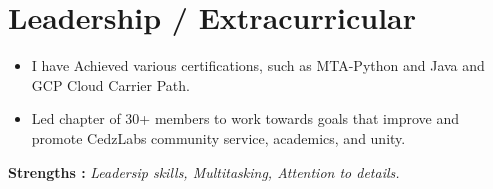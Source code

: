 \documentclass[letterpaper,11pt]{article}
\newcommand{\resumeItem}[1]{
  \item\small{
    {#1 \vspace{-2pt}}
  }
}
\newcommand{\resumeItemListStart}{\begin{itemize}}
\newcommand{\resumeItemListEnd}{\end{itemize}\vspace{-5pt}}
\begin{document}
\section{Leadership / Extracurricular}
            \resumeItemListStart
                \resumeItem{I have Achieved
                various certifications, such as MTA-Python and Java and GCP Cloud Carrier Path.}
                \vspace{-7pt}
                \resumeItem{Led chapter of 30+ members to work towards goals that improve and promote CedzLabs community service, academics, and unity.}
            \resumeItemListEnd
    \vspace{-8pt}
    \textbf{Strengths : }\emph{Leadersip skills,
Multitasking,
Attention to details.
}
\end{document}
